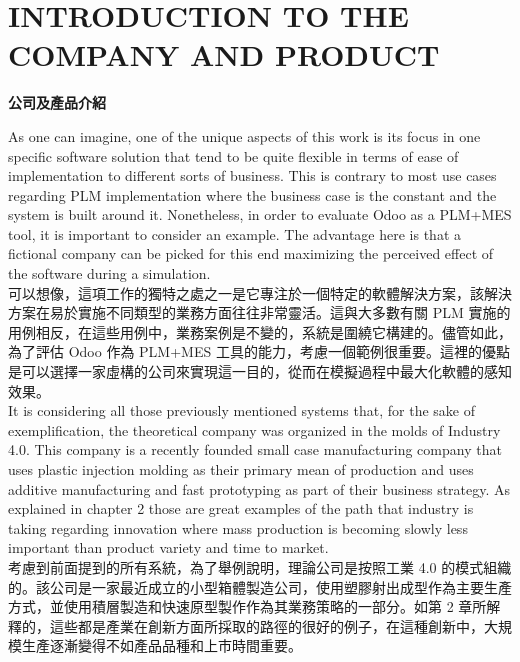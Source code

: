 \chapter{INTRODUCTION TO THE COMPANY AND PRODUCT} 
\setcounter{page}{22}  %
\begin{center}
\fontsize{18}{16}\selectfont \textbf{公司及產品介紹}\\
\end{center}
\vspace{1em}

\fontsize{14pt}{2.5pt}\sectionef 
{As one can imagine, one of the unique aspects of this work is its focus in one specific software solution that tend to be quite flexible in terms of ease of implementation to different sorts of business. This is contrary to most use cases regarding PLM implementation where the business case is the constant and the system is built around it. Nonetheless, in order to evaluate Odoo as a PLM+MES tool, it is important to consider an example. The advantage here is that a fictional company can be picked for this end maximizing the perceived effect of the software during a simulation.}\\[5pt]

\fontsize{14pt}{5pt}\sectionef
 {可以想像，這項工作的獨特之處之一是它專注於一個特定的軟體解決方案，該解決方案在易於實施不同類型的業務方面往往非常靈活。這與大多數有關 PLM 實施的用例相反，在這些用例中，業務案例是不變的，系統是圍繞它構建的。儘管如此，為了評估 Odoo 作為 PLM+MES 工具的能力，考慮一個範例很重要。這裡的優點是可以選擇一家虛構的公司來實現這一目的，從而在模擬過程中最大化軟體的感知效果。}\\[15pt]

\fontsize{14pt}{2.5pt}\sectionef 
{It is considering all those previously mentioned systems that, for the sake of exemplification, the theoretical company was organized in the molds of Industry 4.0. This company is a recently founded small case manufacturing company that uses plastic injection molding as their primary mean of production and uses additive manufacturing and fast prototyping as part of their business strategy. As explained in chapter 2 those are great examples of the path that industry is taking regarding innovation where mass production is becoming slowly less important than product variety and time to market.}\\[5pt]

\fontsize{14pt}{5pt}\sectionef
 {考慮到前面提到的所有系統，為了舉例說明，理論公司是按照工業 4.0 的模式組織的。該公司是一家最近成立的小型箱體製造公司，使用塑膠射出成型作為主要生產方式，並使用積層製造和快速原型製作作為其業務策略的一部分。如第 2 章所解釋的，這些都是產業在創新方面所採取的路徑的很好的例子，在這種創新中，大規模生產逐漸變得不如產品品種和上市時間重要。}\\[15pt]

